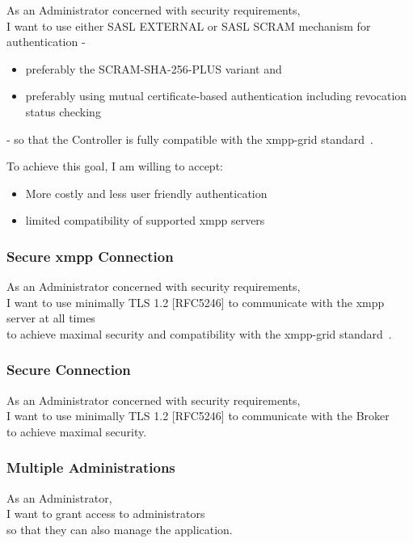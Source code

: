 As an Administrator concerned with security requirements,\\
I want to use either SASL EXTERNAL or SASL SCRAM mechanism for authentication -

\begin{itemize}
    \item preferably the SCRAM-SHA-256-PLUS variant and
    \item preferably using mutual certificate-based authentication including revocation status checking
\end{itemize}

\noindent - so that the Controller is fully compatible with the \gls{xmpp-grid} standard~\cite{ietf-mile-xmpp-grid-05}.

\noindent To achieve this goal, I am willing to accept:
\begin{itemize}
    \item More costly and less user friendly authentication
    \item limited compatibility of supported \gls{xmpp} servers
\end{itemize}

\subsubsection{Secure \gls{xmpp} Connection}

As an Administrator concerned with security requirements,\\
I want to use minimally TLS 1.2 [RFC5246] to communicate with the \gls{xmpp} server at all times\\
to achieve maximal security and compatibility with the \gls{xmpp-grid} standard~\cite{ietf-mile-xmpp-grid-05}.

\subsubsection{Secure Connection}

As an Administrator concerned with security requirements,\\
I want to use minimally TLS 1.2 [RFC5246] to communicate with the Broker\\
to achieve maximal security.

\subsubsection{Multiple Administrations}

As an Administrator,\\
I want to grant access to administrators \\
so that they can also manage the application.

